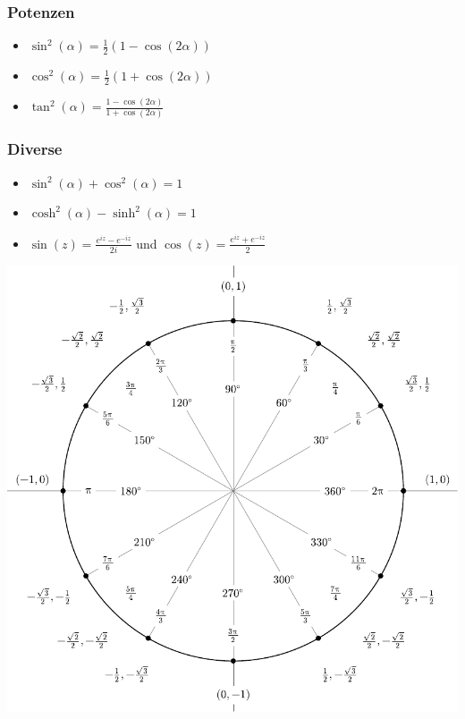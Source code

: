 \documentclass[a4paper,10pt]{article}
\begin{document}
\subsubsection{Potenzen}
\begin{itemize}
 \item $\sin^2(\alpha) = \frac{1}{2}(1-\cos(2\alpha))$
 \item $\cos^2(\alpha) = \frac{1}{2}(1+\cos(2\alpha))$
 \item $\tan^2(\alpha) = \frac{1-\cos(2\alpha)}{1+\cos(2\alpha)}$
\end{itemize}

\subsubsection{Diverse}

\begin{itemize}
 \item $\sin^2(\alpha) + \cos^2(\alpha) = 1$
 \item $\cosh^2(\alpha) - \sinh^2(\alpha) = 1$
 \item $\sin(z) = \frac{e^{iz} - e^{-iz}}{2i}$ und $\cos(z) = \frac{e^{iz} + e^{-iz}}{2}$
\end{itemize}

\begingroup
\renewcommand*{\arraystretch}{2}

\begin{center}
  \includegraphics[width=\linewidth]{include_degrees_circle.pdf}
\end{center}
\end{document}
